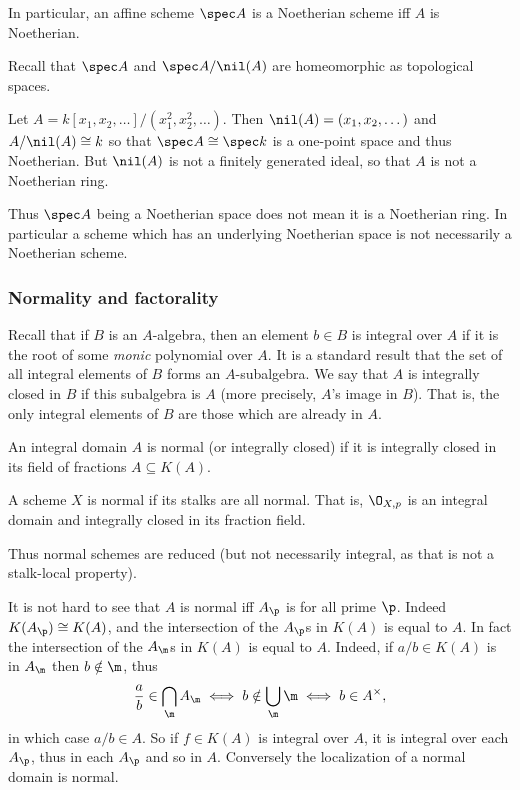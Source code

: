     In particular, an affine scheme $\spec A$ is a Noetherian scheme iff $A$ is Noetherian.

\ecoro

\bremark

    Recall that $\spec A$ and $\spec A/\nil(A)$ are homeomorphic as topological spaces.

    Let $A=k[x_1,x_2,\dots]/(x_1^2,x_2^2,\dots)$.
    Then $\nil(A)=(x_1,x_2,\dots)$ and $A/\nil(A)\cong k$ so that $\spec A\cong\spec k$ is a one-point space and thus Noetherian.
    But $\nil(A)$ is not a finitely generated ideal, so that $A$ is not a Noetherian ring.

    Thus $\spec A$ being a Noetherian space does not mean it is a Noetherian ring.
    In particular a scheme which has an underlying Noetherian space is not necessarily a Noetherian scheme.

\eremark

\subsubsection{Normality and factorality}

Recall that if $B$ is an $A$-algebra, then an element $b\in B$ is {\emphcolor integral} over $A$ if it is the root of some {\it monic\/} polynomial over $A$.
It is a standard result that the set of all integral elements of $B$ forms an $A$-subalgebra.
We say that $A$ is {\emphcolor integrally closed} in $B$ if this subalgebra is $A$ (more precisely, $A$'s image in $B$).
That is, the only integral elements of $B$ are those which are already in $A$.

An integral domain $A$ is {\emphcolor normal} (or {\emphcolor integrally closed}) if it is integrally closed in its field of fractions $A\subseteq K(A)$.

\bdefn

    A scheme $X$ is {\emphcolor normal} if its stalks are all normal.
    That is, $\O_{X,p}$ is an integral domain and integrally closed in its fraction field.

\edefn

Thus normal schemes are reduced (but not necessarily integral, as that is not a stalk-local property).

It is not hard to see that $A$ is normal iff $A_\p$ is for all prime $\p$.
Indeed $K(A_\p)\cong K(A)$, and the intersection of the $A_\p$s in $K(A)$ is equal to $A$.
In fact the intersection of the $A_\m$s in $K(A)$ is equal to $A$.
Indeed, if $a/b\in K(A)$ is in $A_\m$ then $b\notin\m$, thus
$$ \frac ab \in \bigcap_\m A_\m \iff b\notin\bigcup_\m\m \iff b\in A^\times , $$
in which case $a/b\in A$.
So if $f\in K(A)$ is integral over $A$, it is integral over each $A_\p$, thus in each $A_\p$ and so in $A$.
Conversely the localization of a normal domain is normal.


